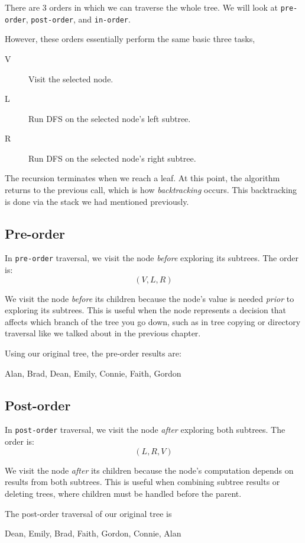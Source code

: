There are 3 orders in which we can traverse the whole tree. We will look at \texttt{pre-order}, \texttt{post-order}, and \texttt{in-order}.


However, these orders essentially perform the same basic three tasks,
\begin{description}
    \item[V] Visit the selected node.
    \item[L] Run DFS on the selected node's left subtree.
    \item[R] Run DFS on the selected node's right subtree.
\end{description}

The recursion terminates when we reach a leaf. At this point, the algorithm returns to the previous call, which is how \emph{backtracking} occurs. This backtracking is done via the stack we had mentioned previously.

\subsection{Pre-order}
In \texttt{pre-order} traversal, we visit the node \emph{before} exploring its subtrees.
The order is:
\[
    (V, L, R)
\]

We visit the node \emph{before} its children because the node's value is needed \emph{prior} to exploring its subtrees.
This is useful when the node represents a decision that affects which branch of the tree you go down, such as in tree copying or directory traversal like we talked about in the previous chapter.

Using our original tree, the pre-order results are:
\begin{center}
    Alan, Brad, Dean, Emily, Connie, Faith, Gordon
\end{center}
\subsection{Post-order}
In \texttt{post-order} traversal, we visit the node \emph{after} exploring both subtrees.
The order is:
\[
    (L, R, V)
\]

We visit the node \emph{after} its children because the node's computation depends on results from both subtrees.
This is useful when combining subtree results or deleting trees, where children must be handled before the parent.

The post-order traversal of our original tree is
\begin{center}
    Dean, Emily, Brad, Faith, Gordon, Connie, Alan
\end{center}
